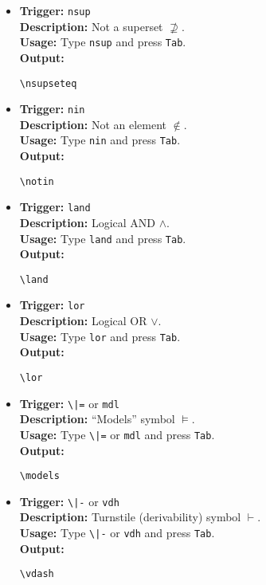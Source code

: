 \documentclass{article}
\begin{document}
\begin{itemize}[leftmargin=*, label={}]
\item \textbf{Trigger:} \texttt{nsup} \\
\textbf{Description:} Not a superset \(\nsupseteq\). \\
\textbf{Usage:} Type \texttt{nsup} and press \texttt{Tab}. \\
\textbf{Output:}
\begin{verbatim}
\nsupseteq 
\end{verbatim}

\item \textbf{Trigger:} \texttt{nin} \\
\textbf{Description:} Not an element \(\notin\). \\
\textbf{Usage:} Type \texttt{nin} and press \texttt{Tab}. \\
\textbf{Output:}
\begin{verbatim}
\notin 
\end{verbatim}

\item \textbf{Trigger:} \texttt{land} \\
\textbf{Description:} Logical AND \(\land\). \\
\textbf{Usage:} Type \texttt{land} and press \texttt{Tab}. \\
\textbf{Output:}
\begin{verbatim}
\land 
\end{verbatim}

\item \textbf{Trigger:} \texttt{lor} \\
\textbf{Description:} Logical OR \(\lor\). \\
\textbf{Usage:} Type \texttt{lor} and press \texttt{Tab}. \\
\textbf{Output:}
\begin{verbatim}
\lor 
\end{verbatim}

\item \textbf{Trigger:} \texttt{\textbackslash|=} or \texttt{mdl} \\
\textbf{Description:} ``Models'' symbol \(\models\). \\
\textbf{Usage:} Type \texttt{\textbackslash|=} or \texttt{mdl} and press \texttt{Tab}. \\
\textbf{Output:}
\begin{verbatim}
\models 
\end{verbatim}

\item \textbf{Trigger:} \texttt{\textbackslash|-} or \texttt{vdh} \\
\textbf{Description:} Turnstile (derivability) symbol \(\vdash\). \\
\textbf{Usage:} Type \texttt{\textbackslash|-} or \texttt{vdh} and press \texttt{Tab}. \\
\textbf{Output:}
\begin{verbatim}
\vdash 
\end{verbatim}
\end{itemize}
\end{document}
